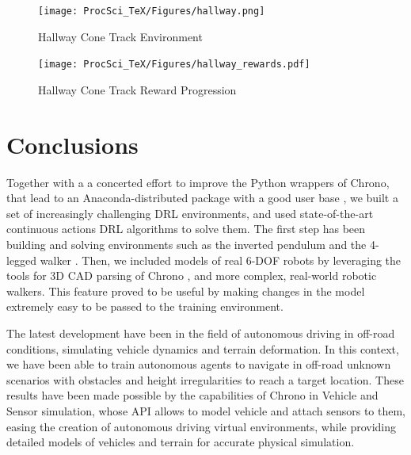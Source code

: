 \documentclass{svproc}
\begin{document}
\begin{figure}[ht]
 \begin{minipage}[b]{0.6\linewidth}
    \centering
    \texttt{[image: ProcSci\_TeX/Figures/hallway.png]}
    \caption{Hallway Cone Track Environment}
    \label{fig:Hallway}
 \end{minipage}
 \begin{minipage}[b]{0.6\linewidth}
    \centering
    \texttt{[image: ProcSci\_TeX/Figures/hallway\_rewards.pdf]}
    \caption{Hallway Cone Track Reward Progression}
    \label{fig:Hallway_rew}
 \end{minipage}
\end{figure}


\section{Conclusions}
Together with a a concerted effort to improve the Python wrappers of Chrono, that lead to an Anaconda-distributed package with a good user base \cite{pyChronoCondaWebSite}, we built a set of increasingly challenging DRL environments, and used state-of-the-art continuous actions DRL algorithms to solve them. The first step has been building and solving environments such as the inverted pendulum and the 4-legged walker \cite{Benatti194Legs}. Then, we included models of real 6-DOF robots by leveraging the tools for 3D CAD parsing of Chrono \cite{Benatti19Solidworks}, and more complex, real-world robotic walkers. This feature proved to be useful by making changes in the model extremely easy to be passed to the training environment.

The latest development have been in the field of autonomous driving in off-road conditions, simulating vehicle dynamics and terrain deformation. In this context, we have been able to train autonomous agents to navigate in off-road unknown scenarios with obstacles and height irregularities to reach a target location.
These results have been made possible by the capabilities of Chrono in Vehicle and Sensor simulation, whose API allows to model vehicle and attach sensors to them, easing the creation of autonomous driving virtual environments, while providing detailed models of vehicles and terrain for accurate physical simulation.



\end{document}
